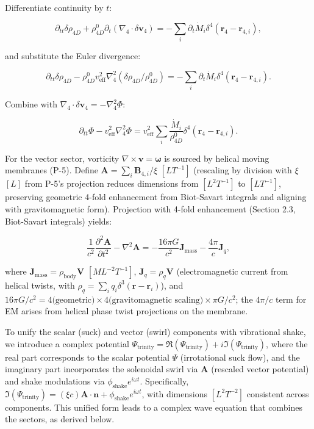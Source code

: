 Differentiate continuity by $t$:

\begin{equation}
\partial_{tt} \delta \rho_{4D} + \rho_{4D}^0 \partial_t (\nabla_4 \cdot \delta \mathbf{v}_4) = -\sum_i \partial_t \dot{M}_i \delta^4(\mathbf{r}_4 - \mathbf{r}_{4,i}),
\end{equation}

and substitute the Euler divergence:

\begin{equation}
\partial_{tt} \delta \rho_{4D} - \rho_{4D}^0 v_{\text{eff}}^2 \nabla_4^2 (\delta \rho_{4D} / \rho_{4D}^0) = -\sum_i \partial_t \dot{M}_i \delta^4(\mathbf{r}_4 - \mathbf{r}_{4,i}).
\end{equation}

Combine with $\nabla_4 \cdot \delta \mathbf{v}_4 = -\nabla_4^2 \Phi$:

\begin{equation}
\partial_{tt} \Phi - v_{\text{eff}}^2 \nabla_4^2 \Phi = v_{\text{eff}}^2 \sum_i \frac{\dot{M}_i}{\rho_{4D}^0} \delta^4(\mathbf{r}_4 - \mathbf{r}_{4,i}).
\end{equation}

For the vector sector, vorticity $\nabla \times \mathbf{v} = \boldsymbol{\omega}$ is sourced by helical moving membranes (P-5). Define $\mathbf{A} = \sum_i \mathbf{B}_{4,i} / \xi$ $[L T^{-1}]$ (rescaling by division with $\xi$ $[L]$ from P-5's projection reduces dimensions from $[L^2 T^{-1}]$ to $[L T^{-1}]$, preserving geometric 4-fold enhancement from Biot-Savart integrals and aligning with gravitomagnetic form). Projection with 4-fold enhancement (Section 2.3, Biot-Savart integrals) yields:

\begin{equation}
\frac{1}{c^2} \frac{\partial^2 \mathbf{A}}{\partial t^2} - \nabla^2 \mathbf{A} = -\frac{16\pi G}{c^2} \mathbf{J}_{\text{mass}} - \frac{4\pi}{c} \mathbf{J}_q,
\end{equation}

where $\mathbf{J}_{\text{mass}} = \rho_{\text{body}} \mathbf{V}$ $[M L^{-2} T^{-1}]$, $\mathbf{J}_q = \rho_q \mathbf{V}$ (electromagnetic current from helical twists, with $\rho_q = \sum_i q_i \delta^3(\mathbf{r} - \mathbf{r}_i)$), and $16\pi G/c^2 = 4 \text{(geometric)} \times 4 \text{(gravitomagnetic scaling)} \times \pi G/c^2$; the $4\pi/c$ term for EM arises from helical phase twist projections on the membrane.

To unify the scalar (suck) and vector (swirl) components with vibrational shake, we introduce a complex potential $\Psi_{\text{trinity}} = \Re(\Psi_{\text{trinity}}) + i \Im(\Psi_{\text{trinity}})$, where the real part corresponds to the scalar potential $\Psi$ (irrotational suck flow), and the imaginary part incorporates the solenoidal swirl via $\mathbf{A}$ (rescaled vector potential) and shake modulations via $\phi_{\text{shake}} e^{i \omega t}$. Specifically, $\Im(\Psi_{\text{trinity}}) = (\xi c) \mathbf{A} \cdot \mathbf{n} + \phi_{\text{shake}} e^{i \omega t}$, with dimensions $[L^2 T^{-2}]$ consistent across components. This unified form leads to a complex wave equation that combines the sectors, as derived below.

